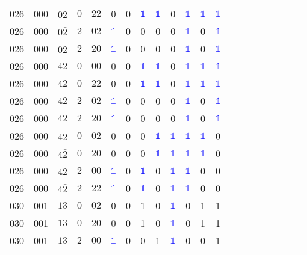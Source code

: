 \begin{longtable*}{c| cccccccccccccccccccc }
026& 000& $0\bar{2}$& $0$& $22$& 0& 0& \textcolor{blue}{$\mathds{1}$}& \textcolor{blue}{$\mathds{1}$}& 0& \textcolor{blue}{$\mathds{1}$}& \textcolor{blue}{$\mathds{1}$}& \textcolor{blue}{$\mathds{1}$}\\
026& 000& $0\bar{2}$& $2$& $02$& \textcolor{blue}{$\mathds{1}$}& 0& 0& 0& 0& \textcolor{blue}{$\mathds{1}$}& 0& \textcolor{blue}{$\mathds{1}$}\\
026& 000& $0\bar{2}$& $2$& $20$& \textcolor{blue}{$\mathds{1}$}& 0& 0& 0& 0& \textcolor{blue}{$\mathds{1}$}& 0& \textcolor{blue}{$\mathds{1}$}\\
026& 000& $42$& $0$& $00$& 0& 0& \textcolor{blue}{$\mathds{1}$}& \textcolor{blue}{$\mathds{1}$}& 0& \textcolor{blue}{$\mathds{1}$}& \textcolor{blue}{$\mathds{1}$}& \textcolor{blue}{$\mathds{1}$}\\
026& 000& $42$& $0$& $22$& 0& 0& \textcolor{blue}{$\mathds{1}$}& \textcolor{blue}{$\mathds{1}$}& 0& \textcolor{blue}{$\mathds{1}$}& \textcolor{blue}{$\mathds{1}$}& \textcolor{blue}{$\mathds{1}$}\\
026& 000& $42$& $2$& $02$& \textcolor{blue}{$\mathds{1}$}& 0& 0& 0& 0& \textcolor{blue}{$\mathds{1}$}& 0& \textcolor{blue}{$\mathds{1}$}\\
026& 000& $42$& $2$& $20$& \textcolor{blue}{$\mathds{1}$}& 0& 0& 0& 0& \textcolor{blue}{$\mathds{1}$}& 0& \textcolor{blue}{$\mathds{1}$}\\
026& 000& $4\bar{2}$& $0$& $02$& 0& 0& 0& \textcolor{blue}{$\mathds{1}$}& \textcolor{blue}{$\mathds{1}$}& \textcolor{blue}{$\mathds{1}$}& \textcolor{blue}{$\mathds{1}$}& 0\\
026& 000& $4\bar{2}$& $0$& $20$& 0& 0& 0& \textcolor{blue}{$\mathds{1}$}& \textcolor{blue}{$\mathds{1}$}& \textcolor{blue}{$\mathds{1}$}& \textcolor{blue}{$\mathds{1}$}& 0\\
026& 000& $4\bar{2}$& $2$& $00$& \textcolor{blue}{$\mathds{1}$}& 0& \textcolor{blue}{$\mathds{1}$}& 0& \textcolor{blue}{$\mathds{1}$}& \textcolor{blue}{$\mathds{1}$}& 0& 0\\
026& 000& $4\bar{2}$& $2$& $22$& \textcolor{blue}{$\mathds{1}$}& 0& \textcolor{blue}{$\mathds{1}$}& 0& \textcolor{blue}{$\mathds{1}$}& \textcolor{blue}{$\mathds{1}$}& 0& 0\\
030& 001& $13$& $0$& $02$& 0& 0& 1& 0& \textcolor{blue}{$\mathds{1}$}& 0& 1& 1\\
030& 001& $13$& $0$& $20$& 0& 0& 1& 0& \textcolor{blue}{$\mathds{1}$}& 0& 1& 1\\
030& 001& $13$& $2$& $00$& \textcolor{blue}{$\mathds{1}$}& 0& 0& 1& \textcolor{blue}{$\mathds{1}$}& 0& 0& 1\\

\end{longtable*}
